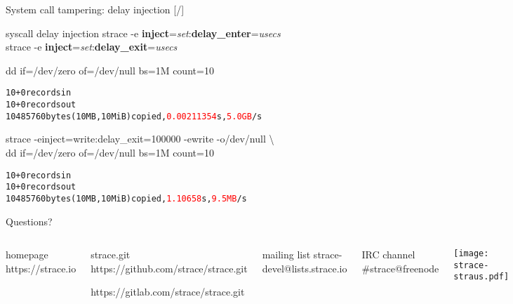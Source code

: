 \documentclass[unicode,aspectratio=169]{beamer}
\begin{document}
\begin{frame}[fragile]{System call tampering: delay injection \hfill [\insertframenumber/\inserttotalframenumber]}
\begin{block}{\large syscall delay injection}
strace -e \textbf{inject}=\textit{set}:\textbf{delay\_enter}=\textit{usecs} \\
strace -e \textbf{inject}=\textit{set}:\textbf{delay\_exit}=\textit{usecs}
\end{block}

\begin{block}{\large dd if=/dev/zero of=/dev/null bs=1M count=10}
\begin{alltt}
10+0 records in
10+0 records out
10485760 bytes (10 MB, 10 MiB) copied, \textcolor{red}{0.00211354} s, \textcolor{red}{5.0 GB}/s
\end{alltt}
\end{block}

\begin{block}{\large strace -einject=write:delay\_exit=100000 -ewrite -o/dev/null \textbackslash\\
dd if=/dev/zero of=/dev/null bs=1M count=10}
\begin{alltt}
10+0 records in
10+0 records out
10485760 bytes (10 MB, 10 MiB) copied, \textcolor{red}{1.10658} s, \textcolor{red}{9.5 MB}/s
\end{alltt}
\end{block}
\end{frame}

{
\begin{frame}{Questions?}
	\begin{columns}
		\column{7cm}
\begin{block}{\large homepage}
	https://strace.io
\end{block}
\begin{block}{\large strace.git}
	https://github.com/strace/strace.git

	https://gitlab.com/strace/strace.git
\end{block}
\begin{block}{\large mailing list}
	strace-devel@lists.strace.io
\end{block}
\begin{block}{\large IRC channel}
	\#strace@freenode
\end{block}
		\column{3cm}
			\centerline{\texttt{[image: strace-straus.pdf]}}
	\end{columns}
\end{frame}
}
\end{document}
